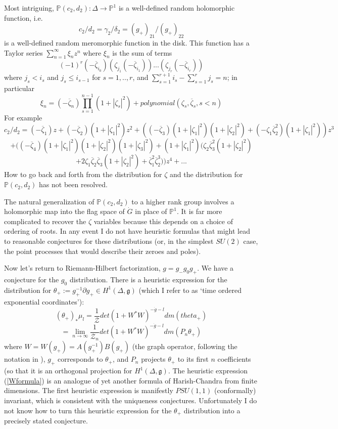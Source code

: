 \documentclass{amsart}
\theoremstyle{conjecture}
\theoremstyle{definition}
\theoremstyle{question}
\theoremstyle{questions}
\theoremstyle{remark}
\theoremstyle{remarks}
\theoremstyle{example}
\numberwithin{equation}{section}
\begin{document}
Most intriguing, $\mathbb P(c_2,d_2):\Delta\to \mathbb P^1$ is a well-defined random holomorphic function, i.e.
$$c_2/d_2=\gamma_2/\delta_2=(g_+)_{21}/(g_+)_{22}$$
is a well-defined random meromorphic function in the disk. This function has a Taylor series
$\sum_{n=1}^{\infty}\xi_nz^n$
where $\xi_n$ is the sum of terms
$$(-1)^r(-\overline \zeta_{i_{0}})\left(\zeta_{j_1}(-\overline \zeta_{i_1})\right)...\left(\zeta_{j_r}(-\overline \zeta_{i_r})\right) $$
where $j_s<i_s$ and $j_s\le i_{s-1}$ for $s=1,..,r$, and $\sum_{s=1}^{r+1} i_s -\sum_{s=1}^r j_s=n$; in particular
$$\xi_n=(-\overline{\zeta}_n)\prod_{s=1}^{n-1}(1+|\zeta_s|^2)+polynomial(\zeta_s,\overline{\zeta}_s,s<n)$$
For example
$$c_2/d_2=(-\overline{\zeta}_1) z+(-\overline{\zeta}_2)(1+|\zeta_1|^2)z^2+\left((-\overline{\zeta}_3)(1+|\zeta_1|^2)(1+|\zeta_2|^2)+
(-\zeta_1\overline{\zeta}_2^2)(1+|\zeta_1|^2)\right)z^3$$
$$+((-\overline{\zeta}_4)(1+|\zeta_1|^2)(1+|\zeta_2|^2)(1+|\zeta_3|^2)
+(1+|\zeta_1|^2)(\zeta_2\overline{\zeta}_3^2(1+|\zeta_2|^2)$$
$$+2\zeta_1\overline{\zeta}_2\overline{\zeta}_3(1+|\zeta_2|^2)
+\overline{\zeta}_1^2\overline{\zeta}_2^3) )z^4+...$$
How to go back and forth from the distribution for $\zeta$ and the distribution for $\mathbb P(c_2,d_2)$
has not been resolved.

The natural generalization of $\mathbb P(c_2,d_2)$ to a higher rank group involves a holomorphic map into
the flag space of $\dot G$ in place of $\mathbb P^1$. It is far more complicated to recover the $\zeta$ variables
because this depends on a choice of ordering of roots. In any event I do not have heuristic formulas that might lead to reasonable conjectures for these distributions (or, in the simplest $SU(2)$ case, the point processes that would describe their zeroes and poles).

Now let's return to Riemann-Hilbert factorization, $g=g_-g_0g_+$. We have a conjecture for the $g_0$ distribution.
There is a heuristic expression for the distribution for $\theta_+:=g_+^{-1}\partial g_+\in H^1(\Delta,\mathfrak g)$
(which I refer to as `time ordered exponential coordinates'):
\begin{equation}\label{Wformula}(\theta_{+})_{*}\mu_l=\frac 1{\mathcal Z}det(1+W^{
*}W)^{-\dot {g}-l}dm(theta_{+})\end{equation}
$$=\lim_{n\to\infty}\frac 1{\mathcal Z_n}det(1+W^{
*}W)^{-\dot {g}-l}dm(P_n\theta_{+})$$
where $W=W(g_{+})=A(g_+^{-1})B(g_{+})$ (the graph operator, following the notation in
\cite{PS}), $g_{+}$ corresponds to $\theta_{+}$, and $P_n$ projects $
\theta_{+}$ to its
first $n$ coefficients (so that it is an orthogonal
projection for $H^1(\Delta,\mathfrak g)$. The heuristic expression (\ref{Wformula}) is an analogue of yet another formula of Harish-Chandra from finite dimensions.  The first heuristic expression is manifestly
$PSU(1,1)$ (conformally) invariant, which is consistent with the uniqueness conjectures. Unfortunately
I do not know how to turn this heuristic expression for the $\theta_+$ distribution into a precisely stated conjecture.
\end{document}

